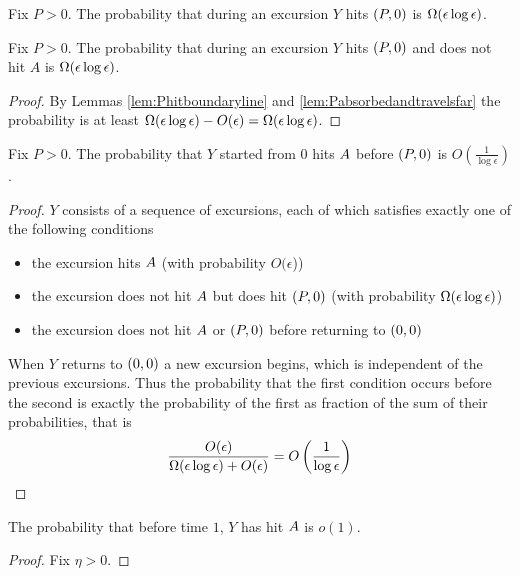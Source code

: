 {\begin{lemma}
  \label{lem:Pabsorbedandtravelsfar}
  Fix $P > 0$.  The probability that during an excursion $Y$ hits $(P,0)$
  is $\Omega(\epsilon\log\epsilon)$.
\end{lemma}

\begin{lemma}
  Fix $P > 0$.  The probability that during an excursion $Y$ hits $(P,0)$
  and does not hit $A$ is $\Omega(\epsilon\log\epsilon)$.
\end{lemma}

\begin{proof}
  By Lemmas \ref{lem:Phitboundaryline} and
  \ref{lem:Pabsorbedandtravelsfar} the probability is at least
  $\Omega(\epsilon\log\epsilon) - O(\epsilon) = \Omega(\epsilon\log\epsilon)$.
\end{proof}

\begin{lemma}
  Fix $P > 0$.  The probability that $Y$ started from $0$ hits
  $A$ before $(P,0)$ is $O(\frac{1}{\log\epsilon})$.
\end{lemma}

\newcommand{\Oe}{O(\epsilon)}

\begin{proof}
  $Y$ consists of a sequence of excursions, each of which satisfies
  exactly one of the following conditions
  \begin{itemize}
  \item the excursion hits $A$ (with probability
    $O(\epsilon$))
  \item the excursion does not hit $A$ but does hit
    $(P,0)$ (with probability $\Omega(\epsilon\log\epsilon)$)
  \item the excursion does not hit $A$ or $(P,0)$ before
    returning to $(0,0)$
  \end{itemize}
  When $Y$ returns to $(0,0)$ a new excursion begins, which is independent of
  the previous excursions.  Thus the probability that the first
  condition occurs before the second is exactly the probability of the
  first as fraction of the sum of their probabilities, that is
  \[
  \frac{\Oe}{\Omegaeloge + \Oe} = O\left(\frac{1}{\log\epsilon}\right)
  \]
\end{proof}

\begin{lemma}
  The probability that before time $1$, $Y$ has hit $A$
  is $o(1)$.
\end{lemma}

\begin{proof}
  Fix $\eta > 0$.


\end{proof}}
